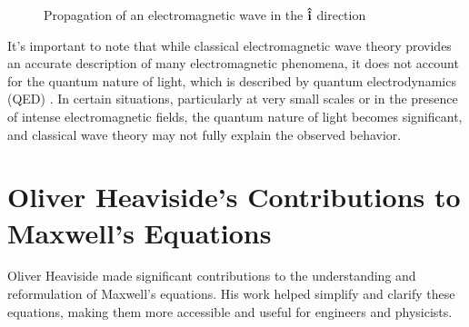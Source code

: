 \documentclass{article}
\theoremstyle{definition}
\begin{document}
\begin{figure}[H]
{{
       }                                                                                %
    }                                                                                   %
\caption{Propagation of an electromagnetic wave in the $\mathbf{\hat{i}}$ direction}
\label{fig:electromagnetic_wave_propagation}
\end{figure}
%
%
%
\bigskip
\noindent
It's important to note that while classical electromagnetic wave
theory provides an accurate description of many electromagnetic
phenomena, it does not account for the quantum nature of light,
which is described by quantum electrodynamics (QED)
\cite{wikipedia:quantum_electrodynamics}. In certain situations,
particularly at very small scales or in the presence of intense
electromagnetic fields, the quantum nature of light becomes
significant, and classical wave theory may not fully explain the
observed behavior.
%
%
%
\section{Oliver Heaviside's Contributions to Maxwell's Equations}
\label{sec:heaviside_contribution}
Oliver Heaviside made significant contributions to the
understanding and reformulation of Maxwell's equations. His work
helped simplify and clarify these equations, making them more
accessible and useful for engineers and physicists. 
\end{document}
